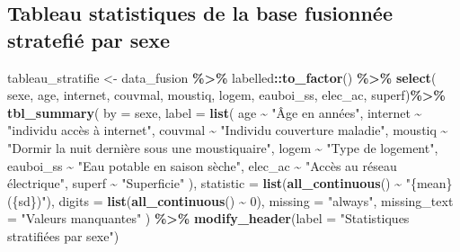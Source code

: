 \documentclass[
]{article}
\newenvironment{Shaded}{\begin{snugshade}}{\end{snugshade}}
\newcommand{\AttributeTok}[1]{\textcolor[rgb]{0.13,0.29,0.53}{#1}}
\newcommand{\DecValTok}[1]{\textcolor[rgb]{0.00,0.00,0.81}{#1}}
\newcommand{\FunctionTok}[1]{\textcolor[rgb]{0.13,0.29,0.53}{\textbf{#1}}}
\newcommand{\NormalTok}[1]{#1}
\newcommand{\OtherTok}[1]{\textcolor[rgb]{0.56,0.35,0.01}{#1}}
\newcommand{\SpecialCharTok}[1]{\textcolor[rgb]{0.81,0.36,0.00}{\textbf{#1}}}
\newcommand{\StringTok}[1]{\textcolor[rgb]{0.31,0.60,0.02}{#1}}
\begin{document}
\subsection{Tableau statistiques de la base fusionnée stratefié par
sexe}\label{tableau-statistiques-de-la-base-fusionnuxe9e-stratefiuxe9-par-sexe}

\begin{Shaded}
\begin{Highlighting}[]
\NormalTok{tableau\_stratifie }\OtherTok{\textless{}{-}}\NormalTok{ data\_fusion }\SpecialCharTok{\%\textgreater{}\%}
\NormalTok{  labelled}\SpecialCharTok{::}\FunctionTok{to\_factor}\NormalTok{() }\SpecialCharTok{\%\textgreater{}\%}
  \FunctionTok{select}\NormalTok{( sexe, age, internet, couvmal, moustiq, logem, eauboi\_ss, elec\_ac, superf)}\SpecialCharTok{\%\textgreater{}\%}
  \FunctionTok{tbl\_summary}\NormalTok{(}
    \AttributeTok{by =}\NormalTok{ sexe,}
    \AttributeTok{label =} \FunctionTok{list}\NormalTok{(}
\NormalTok{      age }\SpecialCharTok{\textasciitilde{}} \StringTok{"Âge en années"}\NormalTok{,}
\NormalTok{      internet }\SpecialCharTok{\textasciitilde{}} \StringTok{"individu accès à internet"}\NormalTok{,}
\NormalTok{      couvmal }\SpecialCharTok{\textasciitilde{}} \StringTok{"Individu couverture maladie"}\NormalTok{,}
\NormalTok{      moustiq }\SpecialCharTok{\textasciitilde{}} \StringTok{"Dormir la nuit dernière sous une moustiquaire"}\NormalTok{,}
\NormalTok{      logem }\SpecialCharTok{\textasciitilde{}} \StringTok{"Type de logement"}\NormalTok{,}
\NormalTok{      eauboi\_ss }\SpecialCharTok{\textasciitilde{}} \StringTok{"Eau potable en saison sèche"}\NormalTok{,}
\NormalTok{      elec\_ac }\SpecialCharTok{\textasciitilde{}} \StringTok{"Accès au réseau électrique"}\NormalTok{,}
\NormalTok{      superf }\SpecialCharTok{\textasciitilde{}} \StringTok{"Superficie"}
\NormalTok{    ),}
    \AttributeTok{statistic =} \FunctionTok{list}\NormalTok{(}\FunctionTok{all\_continuous}\NormalTok{() }\SpecialCharTok{\textasciitilde{}} \StringTok{"\{mean\} (\{sd\})"}\NormalTok{),}
    \AttributeTok{digits =} \FunctionTok{list}\NormalTok{(}\FunctionTok{all\_continuous}\NormalTok{() }\SpecialCharTok{\textasciitilde{}} \DecValTok{0}\NormalTok{),}
    \AttributeTok{missing =} \StringTok{"always"}\NormalTok{,}
    \AttributeTok{missing\_text =} \StringTok{"Valeurs manquantes"}
\NormalTok{  ) }\SpecialCharTok{\%\textgreater{}\%}
  \FunctionTok{modify\_header}\NormalTok{(}\AttributeTok{label =} \StringTok{"Statistiques stratifiées par sexe"}\NormalTok{)}
\end{Highlighting}
\end{Shaded}
\end{document}
